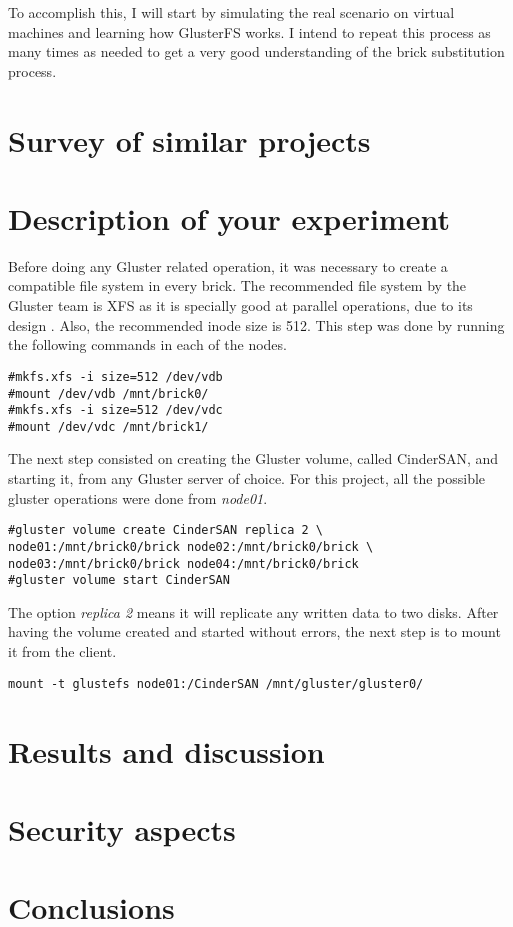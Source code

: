 To accomplish this, I will start by simulating the real scenario on virtual machines and learning how GlusterFS works. I intend to repeat this process as many times as needed to get a very good understanding of the brick substitution process.


\section{Survey of similar projects}


\section{Description of your experiment}

Before doing any Gluster related operation, it was necessary to create a compatible file system in every brick. The recommended file system by the Gluster team is XFS as it is specially good at parallel operations, due to its design \cite{XFS}. Also, the recommended inode size is 512. This step was done by running the following commands in each of the nodes.

\begin{lstlisting}[frame=single]
#mkfs.xfs -i size=512 /dev/vdb
#mount /dev/vdb /mnt/brick0/
#mkfs.xfs -i size=512 /dev/vdc
#mount /dev/vdc /mnt/brick1/
\end{lstlisting}

The next step consisted on creating the Gluster volume, called CinderSAN, and starting it, from any Gluster server of choice. For this project, all the possible gluster operations were done from \textit{node01}.

\begin{lstlisting}[frame=single]
#gluster volume create CinderSAN replica 2 \
node01:/mnt/brick0/brick node02:/mnt/brick0/brick \
node03:/mnt/brick0/brick node04:/mnt/brick0/brick
#gluster volume start CinderSAN
\end{lstlisting}

The option \textit{replica 2} means it will replicate any written data to two disks. After having the volume created and started without errors, the next step is to mount it from the client.

\begin{lstlisting}[frame=single]
mount -t glustefs node01:/CinderSAN /mnt/gluster/gluster0/
\end{lstlisting}


\section{Results and discussion}


\section{Security aspects}


\section{Conclusions}






